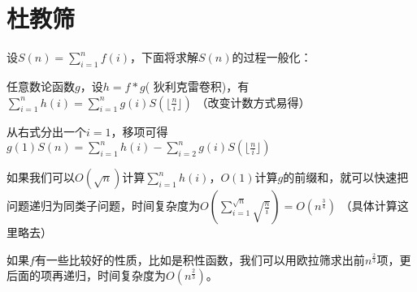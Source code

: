 



\section{杜教筛}
设$S(n)=\sum_{i=1}^nf(i)$，下面将求解$S(n)$的过程一般化：

任意数论函数$g$，设$h=f*g$({\color{red} 狄利克雷卷积})，有$\sum_{i=1}^nh(i)=\sum_{i=1}^ng(i)S(\lfloor \frac{n}{i}\rfloor)$   （改变计数方式易得）

从右式分出一个$i=1$，移项可得$g(1)S(n)=\sum_{i=1}^nh(i)-\sum_{i=2}^ng(i)S(\lfloor \frac{n}{i}\rfloor)$

{\heiti 如果我们可以$O(\sqrt{n})$计算$\sum_{i=1}^nh(i)$，$O(1)$计算$g$的前缀和，就可以快速把问题递归为同类子问题}，时间复杂度为$O(\sum_{i=1}^{\sqrt{n}}\sqrt{\frac{n}{i}})=O(n^{\frac{3}{4}})$       （具体计算这里略去）

如果$f$有一些比较好的性质，比如是积性函数，我们可以用欧拉筛求出前$n^{\frac{2}{3}}$项，更后面的项再递归，时间复杂度为$O(n^{\frac{2}{3}})$。 

